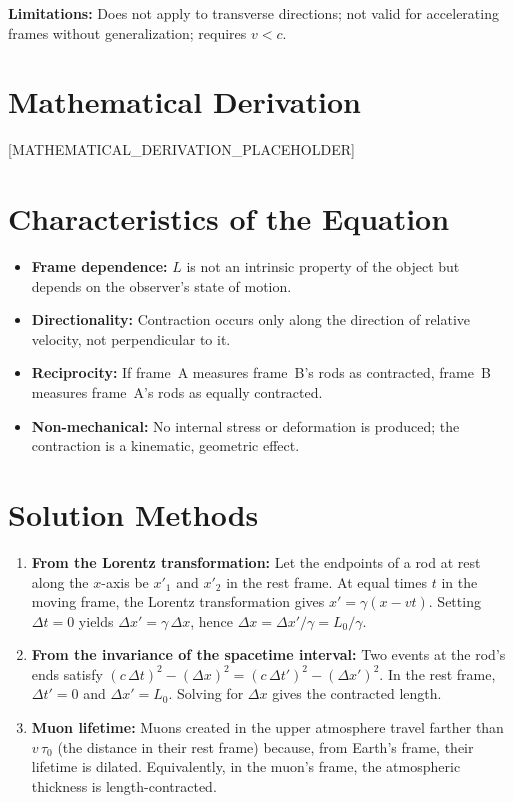 \documentclass[11pt,openright]{book}
\begin{document}
\textbf{Limitations:} Does not apply to transverse directions; not valid for accelerating frames without generalization; requires $v < c$.


\section*{Mathematical Derivation}

[MATHEMATICAL_DERIVATION_PLACEHOLDER]

\section*{Characteristics of the Equation}

\begin{itemize}
  \item \textbf{Frame dependence:} $L$ is not an intrinsic property of the object but depends on the observer's state of motion.
  \item \textbf{Directionality:} Contraction occurs only along the direction of relative velocity, not perpendicular to it.
  \item \textbf{Reciprocity:} If frame~A measures frame~B's rods as contracted, frame~B measures frame~A's rods as equally contracted.
  \item \textbf{Non-mechanical:} No internal stress or deformation is produced; the contraction is a kinematic, geometric effect.
\end{itemize}
\section*{Solution Methods}

\begin{enumerate}
  \item \textbf{From the Lorentz transformation:} Let the endpoints of a rod at rest along the $x$-axis be $x'_{1}$ and $x'_{2}$ in the rest frame. At equal times $t$ in the moving frame, the Lorentz transformation gives $x' = \gamma(x - vt)$. Setting $\Delta t = 0$ yields $\Delta x' = \gamma\,\Delta x$, hence $\Delta x = \Delta x'/\gamma = L_{0}/\gamma$.
  \item \textbf{From the invariance of the spacetime interval:} Two events at the rod's ends satisfy $(c\,\Delta t)^{2} - (\Delta x)^{2} = (c\,\Delta t')^{2} - (\Delta x')^{2}$. In the rest frame, $\Delta t' = 0$ and $\Delta x' = L_{0}$. Solving for $\Delta x$ gives the contracted length.
  \item \textbf{Muon lifetime:} Muons created in the upper atmosphere travel farther than $v\,\tau_{0}$ (the distance in their rest frame) because, from Earth's frame, their lifetime is dilated. Equivalently, in the muon's frame, the atmospheric thickness is length-contracted.
\end{enumerate}
\end{document}
